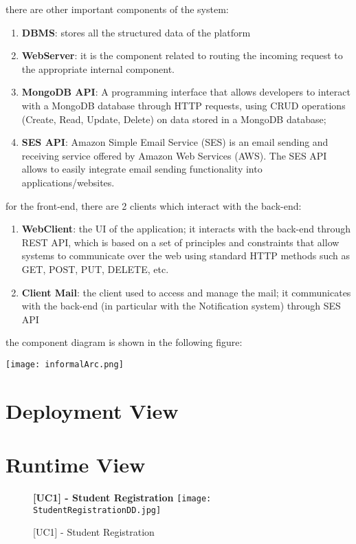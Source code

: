 			there are other important components of the system:
			\begin{enumerate}
				\item \textbf{DBMS}: stores all the structured data of the platform
				\item \textbf {WebServer}: it is the component related to routing the incoming request to the appropriate internal component.
				\item \textbf{MongoDB API}: A programming interface that allows developers to interact with a MongoDB database through HTTP requests, using CRUD operations (Create, Read, Update, Delete) on data stored in a MongoDB database;
				\item \textbf{SES API}: Amazon Simple Email Service (SES) is an email sending and receiving service offered by Amazon Web Services (AWS). The SES API allows to easily integrate email sending functionality into applications/websites.
			
			\end{enumerate}
			
			for the front-end, there are 2 clients which interact with the back-end:
			\begin{enumerate}
				\item \textbf{WebClient}: the UI of the application; it interacts with the back-end through REST API, which is based on a set of principles and constraints that allow systems to communicate over the web using standard HTTP methods such as GET, POST, PUT, DELETE, etc.
				\item \textbf{Client Mail}: the client used to access and manage the mail; it communicates with the back-end (in particular with the Notification system) through SES API
			\end{enumerate}
			
			the component diagram is shown in the following figure:
		
			\texttt{[image: informalArc.png]}
	
	\section{Deployment View}
	\section{Runtime View}
	
	
		\begin{figure}[H]
			\centering
			{\bfseries [UC1] - Student Registration}
			\texttt{[image: StudentRegistrationDD.jpg]}
			\caption{[UC1] - Student Registration}
		\end{figure}
			
